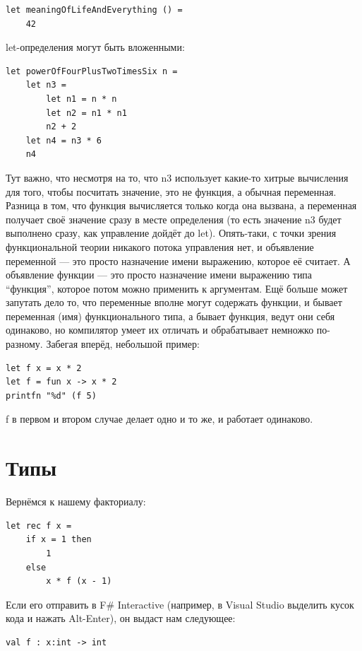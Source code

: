 \documentclass[a5paper]{article}
\begin{document}
\begin{verbatim}
let meaningOfLifeAndEverything () =
    42
\end{verbatim}

let-определения могут быть вложенными:
\begin{verbatim}
let powerOfFourPlusTwoTimesSix n =
    let n3 =
        let n1 = n * n
        let n2 = n1 * n1
        n2 + 2
    let n4 = n3 * 6
    n4
\end{verbatim}

Тут важно, что несмотря на то, что n3 использует какие-то хитрые вычисления для того, чтобы посчитать значение, это не функция, а обычная переменная. Разница в том, что функция вычисляется только когда она вызвана, а переменная получает своё значение сразу в месте определения (то есть значение n3 будет выполнено сразу, как управление дойдёт до let). Опять-таки, с точки зрения функциональной теории никакого потока управления нет, и объявление переменной --- это просто назначение имени выражению, которое её считает. А объявление функции --- это просто назначение имени выражению типа ``функция'', которое потом можно применить к аргументам. Ещё больше может запутать дело то, что переменные вполне могут содержать функции, и бывает переменная (имя) функционального типа, а бывает функция, ведут они себя одинаково, но компилятор умеет их отличать и обрабатывает немножко по-разному. Забегая вперёд, небольшой пример:

\begin{verbatim}
let f x = x * 2
let f = fun x -> x * 2
printfn "%d" (f 5)
\end{verbatim}

f в первом и втором случае делает одно и то же, и работает одинаково.

\section{Типы}

Вернёмся к нашему факториалу:

\begin{verbatim}
let rec f x =
    if x = 1 then
        1
    else
        x * f (x - 1)
\end{verbatim}

Если его отправить в F\# Interactive (например, в Visual Studio выделить кусок кода и нажать Alt-Enter), он выдаст нам следующее:

\begin{verbatim}
val f : x:int -> int
\end{verbatim}
\end{document}
